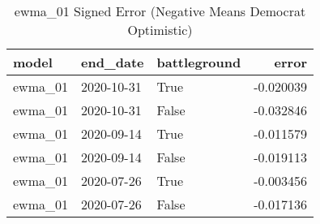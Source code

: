 \begin{table}
\centering
\caption{ewma_01 Signed Error
(Negative Means Democrat Optimistic)}
\begin{tabular}{lllr}
\toprule
   model &    end\_date &  battleground &     error \\
\midrule
 ewma\_01 &  2020-10-31 &          True & -0.020039 \\
 ewma\_01 &  2020-10-31 &         False & -0.032846 \\
 ewma\_01 &  2020-09-14 &          True & -0.011579 \\
 ewma\_01 &  2020-09-14 &         False & -0.019113 \\
 ewma\_01 &  2020-07-26 &          True & -0.003456 \\
 ewma\_01 &  2020-07-26 &         False & -0.017136 \\
\bottomrule
\end{tabular}
\end{table}
